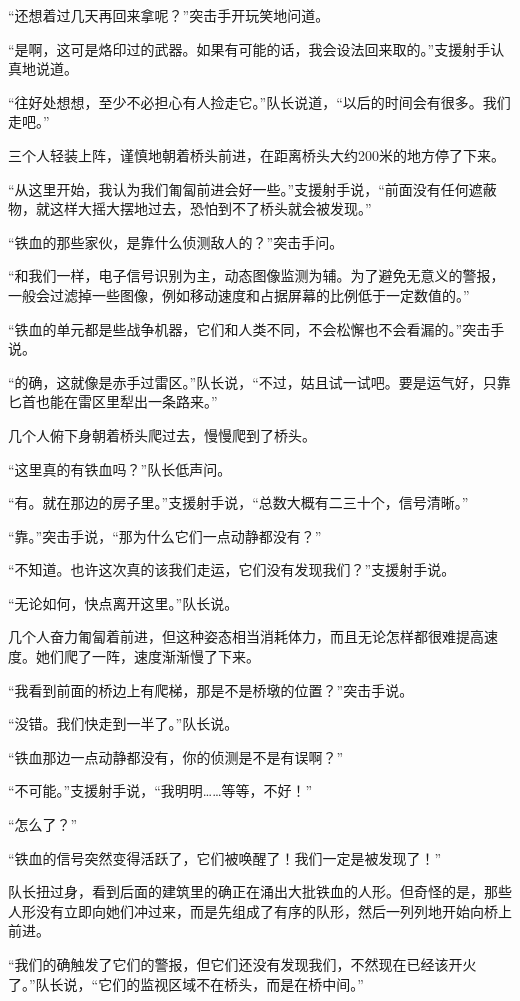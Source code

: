“还想着过几天再回来拿呢？”突击手开玩笑地问道。

“是啊，这可是烙印过的武器。如果有可能的话，我会设法回来取的。”支援射手认真地说道。

“往好处想想，至少不必担心有人捡走它。”队长说道，“以后的时间会有很多。我们走吧。”

三个人轻装上阵，谨慎地朝着桥头前进，在距离桥头大约200米的地方停了下来。

“从这里开始，我认为我们匍匐前进会好一些。”支援射手说，“前面没有任何遮蔽物，就这样大摇大摆地过去，恐怕到不了桥头就会被发现。”

“铁血的那些家伙，是靠什么侦测敌人的？”突击手问。

“和我们一样，电子信号识别为主，动态图像监测为辅。为了避免无意义的警报，一般会过滤掉一些图像，例如移动速度和占据屏幕的比例低于一定数值的。”

“铁血的单元都是些战争机器，它们和人类不同，不会松懈也不会看漏的。”突击手说。

“的确，这就像是赤手过雷区。”队长说，“不过，姑且试一试吧。要是运气好，只靠匕首也能在雷区里犁出一条路来。”

几个人俯下身朝着桥头爬过去，慢慢爬到了桥头。

“这里真的有铁血吗？”队长低声问。

“有。就在那边的房子里。”支援射手说，“总数大概有二三十个，信号清晰。”

“靠。”突击手说，“那为什么它们一点动静都没有？”

“不知道。也许这次真的该我们走运，它们没有发现我们？”支援射手说。

“无论如何，快点离开这里。”队长说。

几个人奋力匍匐着前进，但这种姿态相当消耗体力，而且无论怎样都很难提高速度。她们爬了一阵，速度渐渐慢了下来。

“我看到前面的桥边上有爬梯，那是不是桥墩的位置？”突击手说。

“没错。我们快走到一半了。”队长说。

“铁血那边一点动静都没有，你的侦测是不是有误啊？”

“不可能。”支援射手说，“我明明……等等，不好！”

“怎么了？”

“铁血的信号突然变得活跃了，它们被唤醒了！我们一定是被发现了！”

队长扭过身，看到后面的建筑里的确正在涌出大批铁血的人形。但奇怪的是，那些人形没有立即向她们冲过来，而是先组成了有序的队形，然后一列列地开始向桥上前进。

“我们的确触发了它们的警报，但它们还没有发现我们，不然现在已经该开火了。”队长说，“它们的监视区域不在桥头，而是在桥中间。”

